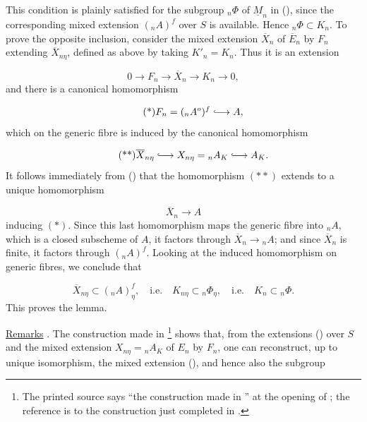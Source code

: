 This condition is plainly satisfied for the subgroup ${}_n\Phi$ of
$\underline M_n$ in (), since the corresponding mixed extension
$({}_nA)^f$ over $S$ is available. Hence ${}_n\Phi\subset K_n$. To
prove the opposite inclusion, consider the mixed extension
$\overline X_n$ of $\overline E_n$ by $F_n$ extending
$\overline X_{n\eta}$, defined as above by taking $K'_n=K_n$. Thus it
is an extension

\begin{equation*}
0\longrightarrow F_n\longrightarrow\overline X_n
 \longrightarrow K_n\longrightarrow0,
\end{equation*}
and there is a canonical homomorphism

\begin{equation}\tag{*}
F_n=({}_nA^o)^f\lhook\joinrel\longrightarrow A,
\end{equation}
which on the generic fibre is induced by the canonical homomorphism

\begin{equation}\tag{**}
\overline X_{n\eta}\lhook\joinrel\longrightarrow X_{n\eta}
 ={}_nA_K\lhook\joinrel\longrightarrow A_K.
\end{equation}
It follows immediately from () that the homomorphism $(**)$ extends
to a unique homomorphism

\begin{equation}\tag{***}
\overline X_n\longrightarrow A
\end{equation}
inducing $(*)$. Since this last homomorphism maps the generic fibre into
${}_nA$, which is a closed subscheme of $A$, it factors through
$\overline X_n\to{}_nA$; and since $\overline X_n$ is finite, it factors
through $({}_nA)^f$. Looking at the induced homomorphism on generic
fibres, we conclude that

\begin{equation*}
\overline X_{n\eta}\subset({}_nA)^f_\eta,
\quad\text{i.e.}\quad
K_{n\eta}\subset{}_n\Phi_\eta,
\quad\text{i.e.}\quad
K_n\subset{}_n\Phi.
\end{equation*}
This proves the lemma.

\medskip
\noindent
\underline{Remarks} . The construction made in \footnote{The
printed source says ``the construction made in '' at the opening of
; the reference is to the construction just completed in .}
shows that, from the extensions () over $S$ and the mixed
extension $X_{n\eta}={}_nA_K$ of $E_n$ by $F_n$, one can reconstruct,
up to unique isomorphism, the mixed extension (), and hence also
the subgroup

